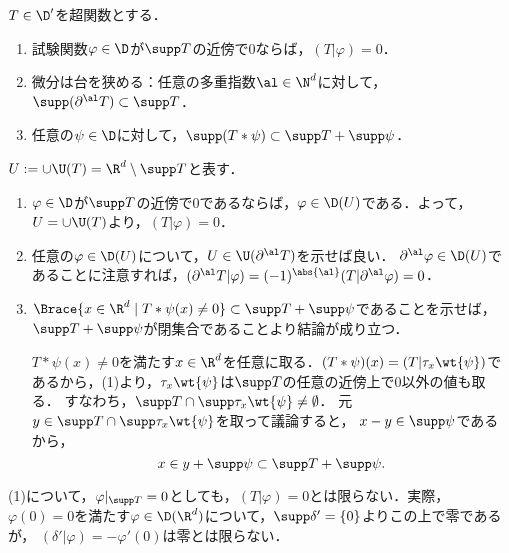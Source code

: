 \documentclass[uplatex,dvipdfmx]{jsreport}
\begin{document}
\begin{proposition}[畳み込みの台は和で抑えられる]\label{prop-property-of-support-of-distribution}
    $T\in\D'$を超関数とする．
    \begin{enumerate}
        \item 試験関数$\varphi\in\D$が$\supp T$の近傍で$0$ならば，$(T|\varphi)=0$．
        \item 微分は台を狭める：任意の多重指数$\al\in\N^d$に対して，$\supp(\partial^\al T)\subset\supp T$．
        \item 任意の$\psi\in\D$に対して，$\supp(T*\psi)\subset\supp T+\supp\psi$．
    \end{enumerate}
\end{proposition}
\begin{Proof}
    $U:=\cup\U(T)=\R^d\setminus\supp T$と表す．
    \begin{enumerate}
        \item $\varphi\in\D$が$\supp T$の近傍で$0$であるならば，$\varphi\in\D(U)$である．よって，$U=\cup\U(T)$より，$(T|\varphi)=0$．
        \item 任意の$\varphi\in\D(U)$について，$U\in\U(\partial^\al T)$を示せば良い．
        $\partial^\al\varphi\in\D(U)$であることに注意すれば，$(\partial^\al T|\varphi)=(-1)^{\abs{\al}}(T|\partial^\al\varphi)=0$．
        \item $\Brace{x\in\R^d\mid T*\psi(x)\ne0}\subset\supp T+\supp\psi$であることを示せば，$\supp T+\supp\psi$が閉集合であることより結論が成り立つ．
        
        $T*\psi(x)\ne0$を満たす$x\in\R^d$を任意に取る．$(T*\psi)(x)=(T|\tau_x\wt{\psi})$であるから，(1)より，$\tau_x\wt{\psi}$は$\supp T$の任意の近傍上で$0$以外の値も取る．
        すなわち，$\supp T\cap \supp\tau_x\wt{\psi}\ne\emptyset$．
        元$y\in\supp T\cap \supp\tau_x\wt{\psi}$を取って議論すると，
        $x-y\in\supp\psi$であるから，
        \[x\in y+\supp\psi\subset\supp T+\supp\psi.\]
    \end{enumerate}
\end{Proof}
\begin{remark}[超関数の台の上で零でも値は非零になり得る]
    (1)について，$\varphi|_{\supp T}=0$としても，$(T|\varphi)=0$とは限らない．実際，$\varphi(0)=0$を満たす$\varphi\in\D(\R^d)$について，$\supp\delta'=\{0\}$よりこの上で零であるが，
    $(\delta'|\varphi)=-\varphi'(0)$は零とは限らない．
\end{remark}
\end{document}
